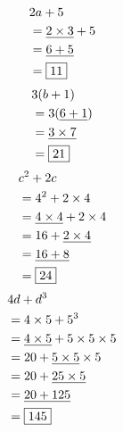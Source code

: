 \documentclass[../Cours.tex]{subfiles}
\begin{document}
\begin{questions}
        \question 
            \begin{align*}
                &2a+5 \\
                &= \underline{2 \times 3} + 5 \\
                &= \underline{6+5} \\
                &= \fbox{11}
            \end{align*}
        \question
            \begin{align*}
                &3(b+1) \\
                &= 3(\underline{6+1}) \\
                &= \underline{3 \times 7} \\
                &= \fbox{21}
            \end{align*}
        \question 
            \begin{align*}
                &c^2+2c \\
                &= 4^2 + 2 \times 4 \\
                &= \underline{4 \times 4} + 2 \times 4 \\
                &= 16 + \underline{2 \times 4} \\
                &= \underline{16 + 8} \\
                &= \fbox{24}
            \end{align*}
        \question 
            \begin{align*}
                &4d + d^3 \\
                &= 4 \times 5 + 5^3 \\
                &= \underline{4 \times 5} + 5 \times 5 \times 5 \\
                &= 20 + \underline{5 \times 5} \times 5 \\
                &= 20 + \underline{25 \times 5} \\
                &= \underline{20 + 125} \\
                &= \fbox{145}
            \end{align*}
\end{questions}
\end{document}
